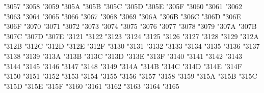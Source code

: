 {\Uchar\jis"3057 %
\Uchar\jis"3058 %
\Uchar\jis"3059 %
\Uchar\jis"305A %
\Uchar\jis"305B %
\Uchar\jis"305C %
\Uchar\jis"305D %
\Uchar\jis"305E %
\Uchar\jis"305F %
\Uchar\jis"3060 %
\Uchar\jis"3061 %
\Uchar\jis"3062 %
\Uchar\jis"3063 %
\Uchar\jis"3064 %
\Uchar\jis"3065 %
\Uchar\jis"3066 %
\Uchar\jis"3067 %
\Uchar\jis"3068 %
\Uchar\jis"3069 %
\Uchar\jis"306A %
\Uchar\jis"306B %
\Uchar\jis"306C %
\Uchar\jis"306D %
\Uchar\jis"306E %
\Uchar\jis"306F %
\Uchar\jis"3070 %
\Uchar\jis"3071 %
\Uchar\jis"3072 %
\Uchar\jis"3073 %
\Uchar\jis"3074 %
\Uchar\jis"3075 %
\Uchar\jis"3076 %
\Uchar\jis"3077 %
\Uchar\jis"3078 %
\Uchar\jis"3079 %
\Uchar\jis"307A %
\Uchar\jis"307B %
\Uchar\jis"307C %
\Uchar\jis"307D %
\Uchar\jis"307E %
\Uchar\jis"3121 %
\Uchar\jis"3122 %
\Uchar\jis"3123 %
\Uchar\jis"3124 %
\Uchar\jis"3125 %
\Uchar\jis"3126 %
\Uchar\jis"3127 %
\Uchar\jis"3128 %
\Uchar\jis"3129 %
\Uchar\jis"312A %
\Uchar\jis"312B %
\Uchar\jis"312C %
\Uchar\jis"312D %
\Uchar\jis"312E %
\Uchar\jis"312F %
\Uchar\jis"3130 %
\Uchar\jis"3131 %
\Uchar\jis"3132 %
\Uchar\jis"3133 %
\Uchar\jis"3134 %
\Uchar\jis"3135 %
\Uchar\jis"3136 %
\Uchar\jis"3137 %
\Uchar\jis"3138 %
\Uchar\jis"3139 %
\Uchar\jis"313A %
\Uchar\jis"313B %
\Uchar\jis"313C %
\Uchar\jis"313D %
\Uchar\jis"313E %
\Uchar\jis"313F %
\Uchar\jis"3140 %
\Uchar\jis"3141 %
\Uchar\jis"3142 %
\Uchar\jis"3143 %
\Uchar\jis"3144 %
\Uchar\jis"3145 %
\Uchar\jis"3146 %
\Uchar\jis"3147 %
\Uchar\jis"3148 %
\Uchar\jis"3149 %
\Uchar\jis"314A %
\Uchar\jis"314B %
\Uchar\jis"314C %
\Uchar\jis"314D %
\Uchar\jis"314E %
\Uchar\jis"314F %
\Uchar\jis"3150 %
\Uchar\jis"3151 %
\Uchar\jis"3152 %
\Uchar\jis"3153 %
\Uchar\jis"3154 %
\Uchar\jis"3155 %
\Uchar\jis"3156 %
\Uchar\jis"3157 %
\Uchar\jis"3158 %
\Uchar\jis"3159 %
\Uchar\jis"315A %
\Uchar\jis"315B %
\Uchar\jis"315C %
\Uchar\jis"315D %
\Uchar\jis"315E %
\Uchar\jis"315F %
\Uchar\jis"3160 %
\Uchar\jis"3161 %
\Uchar\jis"3162 %
\Uchar\jis"3163 %
\Uchar\jis"3164 %
\Uchar\jis"3165 %
}
